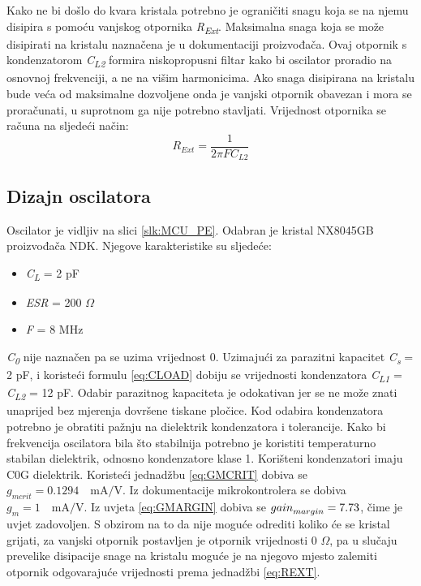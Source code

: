 Kako ne bi došlo do kvara kristala potrebno je ograničiti snagu koja se na njemu disipira s pomoću vanjskog otpornika \textit{R\textsubscript{Ext}}. Maksimalna snaga koja se može disipirati na kristalu naznačena je u dokumentaciji proizvođača. Ovaj otpornik s kondenzatorom \textit{C\textsubscript{L2}} formira niskopropusni filtar kako bi oscilator proradio na osnovnoj frekvenciji, a ne na višim harmonicima. Ako snaga disipirana na kristalu bude veća od maksimalne dozvoljene onda je vanjski otpornik obavezan i mora se proračunati, u suprotnom ga nije potrebno stavljati. Vrijednost otpornika se računa na sljedeći način:
\begin{equation} \label{eq:REXT}
    R_{Ext}=\frac{1}{2\pi F C_{L2}}
\end{equation}

\subsection{Dizajn oscilatora}

Oscilator je vidljiv na slici \ref{slk:MCU_PE}. Odabran je kristal NX8045GB proizvođača NDK. Njegove karakteristike su sljedeće:
\begin{itemize}
    \item \textit{C\textsubscript{L}} = 2 pF
    \item \textit{ESR} = 200 $\Omega$
    \item \textit{F} = 8 MHz
\end{itemize}
\textit{C\textsubscript{0}} nije naznačen pa se uzima vrijednost 0. Uzimajući za parazitni kapacitet \textit{C\textsubscript{s}} = 2 pF, i koristeći formulu \ref{eq:CLOAD} dobiju se vrijednosti kondenzatora \textit{C\textsubscript{L1}} = \textit{C\textsubscript{L2}} = 12 pF. Odabir parazitnog kapaciteta je odokativan jer se ne može znati unaprijed bez mjerenja dovršene tiskane pločice. Kod odabira kondenzatora potrebno je obratiti pažnju na dielektrik kondenzatora i tolerancije. Kako bi frekvencija oscilatora bila što stabilnija potrebno je koristiti temperaturno stabilan dielektrik, odnosno kondenzatore klase 1. Korišteni kondenzatori imaju C0G dielektrik. Koristeći jednadžbu \ref{eq:GMCRIT} dobiva se ${g_{mcrit} = 0.1294 \quad \textrm{mA/V}}$. Iz dokumentacije mikrokontrolera se dobiva ${g_m = 1\quad \textrm{mA/V}}$. Iz uvjeta \ref{eq:GMARGIN} dobiva se ${{gain}_{margin}=\nolinebreak 7.73}$, čime je uvjet zadovoljen. S obzirom na to da nije moguće odrediti koliko će se kristal grijati, za vanjski otpornik postavljen je otpornik vrijednosti 0 $\Omega$, pa u slučaju prevelike disipacije snage na kristalu moguće je na njegovo mjesto zalemiti otpornik odgovarajuće vrijednosti prema jednadžbi \ref{eq:REXT}.


